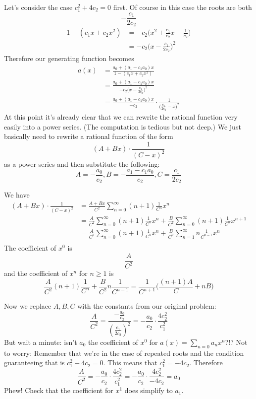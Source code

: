 Let's consider the case $c_1^2 + 4c_2 = 0$ first.
Of course in this case the roots are both
\[
-\frac{c_1}{2c_2}
\]
\begin{align*}
1 - (c_1 x + c_2 x^2)
&= -c_2 \biggl( x^2 + \frac{c_1}{c_2} x - \frac{1}{c_2} \biggr) \\
&= -c_2 \biggl( x - \frac{c_1}{2c_2} \biggr)^2
\end{align*}
Therefore our generating function becomes
\begin{align*}
a(x) 
&=
\frac
{a_0 + (a_1 - c_1 a_0) x}
{1 - (c_1 x + c_2 x^2)} \\
&=
\frac
{a_0 + (a_1 - c_1 a_0) x}
{-c_2 \bigl( x - \frac{c_1}{2c_2} \bigr)^2} \\
&=
\frac {a_0 + (a_1 - c_1 a_0) x} {-c_2} \cdot
\frac{1}{\bigl(\frac{c_1}{2c_2} - x \bigr)^2}
\end{align*}
At this point it's already clear that we can rewrite the rational
function very easily into a power series.
(The computation is tedious but not deep.)
We just basically need to rewrite a rational function of the
form
\[
(A + Bx) \cdot \frac{1}{(C - x)^2}
\]
as a power series and then substitute the following:
\[
A = -\frac{a_0}{c_2}, B = -\frac{a_1 - c_1 a_0}{c_2}, 
C = \frac{c_1}{2c_2}
\]

We have
\begin{align*}
(A + Bx) \cdot \frac{1}{(C - x)^2}
&= \frac{A + Bx}{C^2} \sum_{n=0}^\infty (n+1) \frac{1}{C^n} x^n \\
&= \frac{A }{C^2} \sum_{n=0}^\infty (n+1) \frac{1}{C^n} x^n 
+ \frac{B}{C^2} \sum_{n=0}^\infty (n+1) \frac{1}{C^n} x^{n+1}
\\
&= \frac{A }{C^2} \sum_{n=0}^\infty (n+1) \frac{1}{C^n} x^n 
+ \frac{B}{C^2} \sum_{n=1}^\infty n \frac{1}{C^{n-1}} x^n
\\
\end{align*}
The coefficient of $x^0$ is
\[
\frac{A}{C^2}
\]
and the coefficient of $x^n$ for $n \geq 1$ is
\[
\frac{A}{C^2}(n+1)\frac{1}{C^n} + \frac{B}{C^2} n \frac{1}{C^{n-1}}
= \frac{1}{C^{n+1}}
\biggl(
\frac{(n+1)A}{C}
+
nB 
\biggr)
\]

Now we replace $A, B, C$ with the constants from our original problem:
\[
\frac{A}{C^2} 
=
\frac{-\frac{a_0}{c_2}}{(\frac{c_1}{2c_2})^2}
=
-\frac{a_0}{c_2} \cdot \frac{4c_2^2}{c_1^2}
\]
But wait a minute:
isn't $a_0$ the coefficient of $x^0$ for $a(x) = \sum_{n=0} a_nx^n$?!?
Not to worry:
Remember that we're in the case of repeated roots and the
condition guaranteeing that is $c_1^2  + 4c_2 = 0$.
This means that $c_1^2 = -4c_2$.
Therefore
\[
\frac{A}{C^2} 
=
-\frac{a_0}{c_2} \cdot \frac{4c_2^2}{c_1^2}
= -\frac{a_0}{c_2} \cdot \frac{4c_2^2}{-4c_2}
= a_0
\]
Phew! Check that the coefficient for $x^1$ does simplify to $a_1$.

